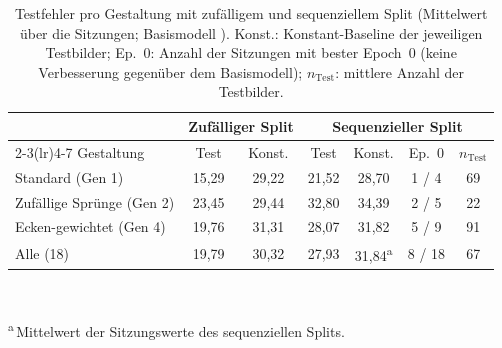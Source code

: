 \begin{table}[htbp]
  \centering
  \caption[Testfehler pro Gestaltung mit zufälligem und sequenziellem Split]{Testfehler pro Gestaltung mit zufälligem und sequenziellem Split
           (Mittelwert über die Sitzungen; Basismodell ).
           Konst.: Konstant-Baseline der jeweiligen Testbilder; Ep.~0: Anzahl
           der Sitzungen mit bester Epoch~0 (keine Verbesserung gegenüber dem
           Basismodell); $n_{\text{Test}}$: mittlere Anzahl der Testbilder.}
  \label{tab:design_perf}
  \footnotesize
  \setlength{\tabcolsep}{4pt}
  \begin{tabular}{l cc cccc}
    \toprule
    & \multicolumn{2}{c}{Zufälliger Split} & \multicolumn{4}{c}{Sequenzieller Split} \\
    \cmidrule(lr){2-3}\cmidrule(lr){4-7}
    Gestaltung & Test & Konst. & Test & Konst. & Ep.~0 & $n_{\text{Test}}$ \\
    \midrule
    Standard (Gen 1)          & 15,29 & 29,22 & 21,52 & 28,70 & 1 / 4 & 69 \\
    Zufällige Sprünge (Gen 2) & 23,45 & 29,44 & 32,80 & 34,39 & 2 / 5 & 22 \\
    Ecken-gewichtet (Gen 4)   & 19,76 & 31,31 & 28,07 & 31,82 & 5 / 9 & 91 \\
    \midrule
    Alle (18)                 & 19,79 & 30,32 & 27,93 & 31,84\textsuperscript{a} & 8 / 18 & 67 \\
    \bottomrule
  \end{tabular}\\[1mm]
  \parbox{0.9\linewidth}{\footnotesize \textsuperscript{a}\,Mittelwert der
  Sitzungswerte des sequenziellen Splits.}
\end{table}

